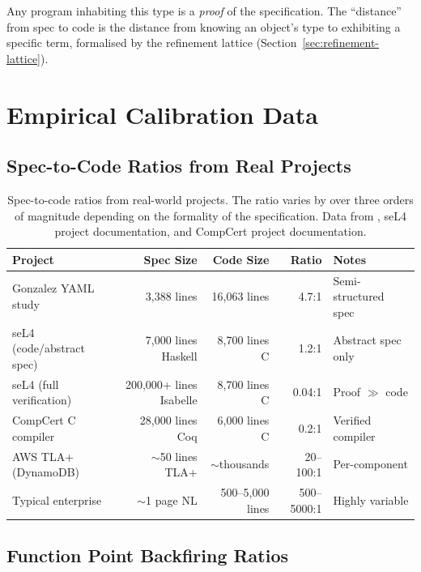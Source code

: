\documentclass[11pt, a4paper, copyright]{googledeepmind}
\begin{document}
Any program inhabiting this type is a \emph{proof} of the specification. The ``distance'' from spec to code is the distance from knowing an object's type to exhibiting a specific term, formalised by the refinement lattice (Section~\ref{sec:refinement-lattice}).


\section{Empirical Calibration Data}
\label{app:empirical}

\subsection{Spec-to-Code Ratios from Real Projects}

\begin{table}[H]
\centering
\small
\begin{tabular}{lrrrl}
\toprule
\textbf{Project} & \textbf{Spec Size} & \textbf{Code Size} & \textbf{Ratio} & \textbf{Notes} \\
\midrule
Gonzalez YAML study & 3,388 lines & 16,063 lines & 4.7:1 & Semi-structured spec \\
seL4 (code/abstract spec) & 7,000 lines Haskell & 8,700 lines C & 1.2:1 & Abstract spec only \\
seL4 (full verification) & 200,000+ lines Isabelle & 8,700 lines C & 0.04:1 & Proof $\gg$ code \\
CompCert C compiler & 28,000 lines Coq & 6,000 lines C & 0.2:1 & Verified compiler \\
AWS TLA+ (DynamoDB) & $\sim$50 lines TLA+ & $\sim$thousands & 20--100:1 & Per-component \\
Typical enterprise & $\sim$1 page NL & 500--5,000 lines & 500--5000:1 & Highly variable \\
\bottomrule
\end{tabular}
\caption{Spec-to-code ratios from real-world projects. The ratio varies by over three orders of magnitude depending on the formality of the specification. Data from \citet{newcombe2015amazon, gonzalez2026spec}, seL4 project documentation, and CompCert project documentation.}
\label{tab:spec-code-ratios}
\end{table}

\subsection{Function Point Backfiring Ratios}
\end{document}
